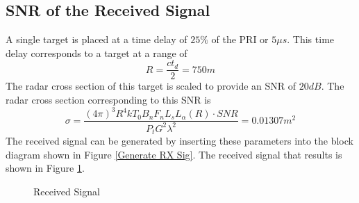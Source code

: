 \documentclass[12pt,letterpaper]{article}
\begin{document}
\subsection{SNR of the Received Signal}
A single target is placed at a time delay  of $25\%$ of the PRI or $5\mu s$. This time delay corresponds to a target at a range of
\begin{equation}
R = \frac{ct_d}{2} = 750 m
\label{tgt1 range}
\end{equation}
The radar cross section of this target is scaled to provide an SNR of $20dB$. The radar cross section corresponding to this SNR is
\begin{equation}
\sigma = \frac{(4\pi)^3 R^4 k T_0 B_n F_n L_s L_\alpha(R)\cdot SNR}{P_t G^2 \lambda^2} = 0.01307 m^2
\label{tgt1 rcs}
\end{equation}
The received signal can be generated by inserting these parameters into the block diagram shown in Figure \ref{Generate RX Sig}. The received signal that results is shown in Figure \ref{ADC Sig}.
\begin{figure}[H]
\caption{Received Signal}
\label{ADC Sig}
\end{figure}
\end{document}
